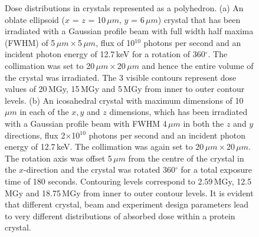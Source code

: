 \begin{figure}
\begin{subfigure}[b]{0.437\textwidth}
                    \caption{}
                    \label{fig:Icosohedral crystal}
            \end{subfigure}
            \caption[Dose distributions in crystals represented as a polyhedron]{Dose distributions in crystals represented as a polyhedron.
            (a) An oblate ellipsoid ($x$ = $z$ = 10\,$\mu m$, $y$ = 6\,$\mu m$) crystal that has been irradiated with a Gaussian profile beam with full width half maxima (FWHM) of 5\,$\mu m \times $5\,$\mu m$, flux of 10$^{\text{10}}$ photons per second and an incident photon energy of 12.7\,keV for a rotation of 360$^{\circ}$.
            The collimation was set to 20\,$\mu m \times $20\,$\mu m$ and hence the entire volume of the crystal was irradiated.
            The 3 visible contours represent dose values of 20\,MGy, 15\,MGy and 5\,MGy from inner to outer contour levels.
            (b) An icosahedral crystal with maximum dimensions of 10\,$\mu m$ in each of the $x, y$ and $z$ dimensions, which has been irradiated with a Gaussian profile beam with FWHM 4\,$\mu m$ in both the $z$ and $y$ directions, flux 2$ \times $10$^{\text{10}}$ photons per second and an incident photon energy of 12.7\,keV.
            The collimation was again set to 20\,$\mu m \times $20\,$\mu m$.
            The rotation axis was offset 5\,$\mu m$ from the centre of the crystal in the $x$-direction and the crystal was rotated 360$^{\circ}$ for a total exposure time of 180 seconds.
            Contouring levels correspond to 2.59\,MGy, 12.5\,MGy and 18.75\,MGy from inner to outer contour levels.
            It is evident that different crystal, beam and experiment design parameters lead to very different distributions of absorbed dose within a protein crystal.}
            \label{fig:RADDOSE-3D Polyhedral Crystal Examples}
        \end{figure}

